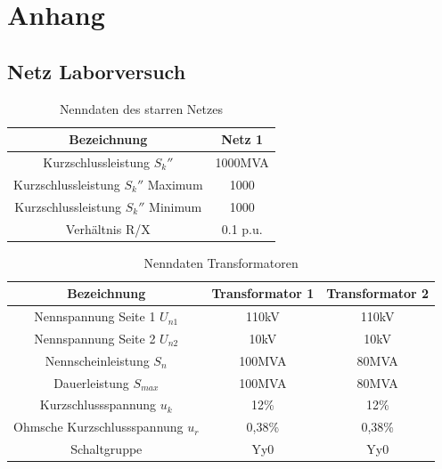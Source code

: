 \section{Anhang}
\subsection{Netz Laborversuch}
\begin{table}[H]
\begin{tabular}{|c|c|}
\hline 
\textbf{Bezeichnung} & \textbf{Netz 1} \\ 
\hline 
Kurzschlussleistung $S_k''$ & 1000MVA \\ 
\hline 
Kurzschlussleistung $S_k''$ Maximum & 1000 \\ 
\hline 
Kurzschlussleistung $S_k''$ Minimum & 1000 \\ 
\hline 
Verhältnis R/X & 0.1 p.u. \\ 
\hline
\end{tabular} 
\caption{Nenndaten des starren Netzes}
\end{table}

\begin{table}[H]
\begin{tabular}{|c|c|c|}
\hline 
\textbf{Bezeichnung} & \textbf{Transformator 1} & \textbf{Transformator 2} \\ 
\hline 
Nennspannung Seite 1 $U_{n1}$ & 110kV & 110kV \\ 
\hline 
Nennspannung Seite 2 $U_{n2}$ & 10kV & 10kV \\ 
\hline 
Nennscheinleistung $S_n$ & 100MVA & 80MVA \\ 
\hline 
Dauerleistung $S_{max}$ & 100MVA & 80MVA \\ 
\hline 
Kurzschlussspannung $u_k$ & 12\% & 12\% \\ 
\hline 
Ohmsche Kurzschlussspannung $u_r$ & 0,38\% & 0,38\% \\ 
\hline 
Schaltgruppe & Yy0 & Yy0 \\ 
\hline 
\end{tabular}
\caption{Nenndaten Transformatoren}
\end{table}

